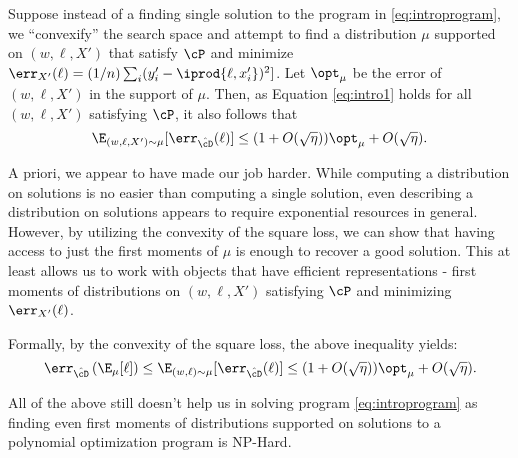 Suppose instead of a finding single solution to the program in \eqref{eq:introprogram}, we ``convexify'' the search space and attempt to find a distribution $\mu$ supported on $(w,\ell,X')$ that satisfy $\cP$ and minimize $\err_{X'}(\ell) = (1/n) \sum_i (y_i' - \iprod{\ell,x'_i})^2]$. Let $\opt_{\mu}$ be the error of $(w,\ell,X')$ in the support of $\mu$. Then, as Equation \ref{eq:intro1} holds for all $(w,\ell,X')$ satisfying $\cP$, it also follows that
\begin{equation}\E_{(w,\ell,X') \sim \mu}[ \err_{\hat{\cD}}(\ell)] \leq (1 + O(\sqrt{\eta})) \opt_\mu + O(\sqrt{\eta}).\label{eq:error-equation-intro}\end{equation}

A priori, we appear to have made our job harder. While computing a distribution on solutions is no easier than computing a single solution, even describing a distribution on solutions appears to require exponential resources in general. However, by utilizing the convexity of the square loss, we can show that having access to just the first moments of $\mu$ is enough to recover a good solution. This at least allows us to work with objects that have efficient representations - first moments of distributions on $(w,\ell,X')$ satisfying $\cP$ and minimizing $\err_{X'}(\ell)$. 

Formally, by the convexity of the square loss, the above inequality yields:
\begin{equation} \label{eq:convexity-intro}\err_{\hat{\cD}}\left(\E_\mu[\ell]\right) \leq \E_{(w,\ell) \sim \mu}[ \err_{\hat{\cD}}(\ell)] \leq (1 + O(\sqrt{\eta})) \opt_\mu + O(\sqrt{\eta}).\end{equation}

All of the above still doesn't help us in solving program \ref{eq:introprogram} as finding even first moments of distributions supported on solutions to a polynomial optimization program is NP-Hard. %


